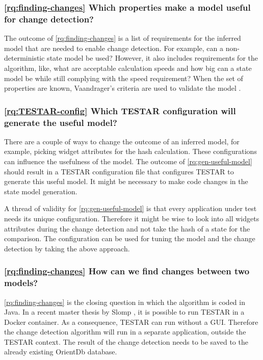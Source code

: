 \subsubsection{\ref{rq:finding-changes} Which properties make a model useful for change detection?}
The outcome of \ref{rq:finding-changes} is a list of requirements for the inferred model that are needed to enable change detection. For example, can a non-deterministic state model be used? However, it also includes requirements for the algorithm, like, what are acceptable calculation speeds and how big can a state model be while still complying with the speed requirement? When the set of properties are known, Vaandrager's criteria are used to validate the model \cite{vaandrager}.

\subsubsection{\ref{rq:TESTAR-config} Which TESTAR configuration will generate the useful model?}
There are a couple of ways to change the outcome of an inferred model, for example, picking widget attributes for the hash calculation. These configurations can influence the usefulness of the model. The outcome of \ref{rq:gen-useful-model} should result in a TESTAR configuration file that configures TESTAR to generate this useful model. It might be necessary to make code changes in the state model generation.

A thread of validity for \ref{rq:gen-useful-model} is that every application under test needs its unique configuration. Therefore it might be wise to look into all widgets attributes during the change detection and not take the hash of a state for the comparison. The configuration can be used for tuning the model and the change detection by taking the above approach.

\subsubsection{\ref{rq:finding-changes} How can we find changes between two models?}
\ref{rq:finding-changes} is the closing question in which the algorithm is coded in Java. In a recent master thesis by Slomp \cite{insert-slomp-hereTODO}, it is possible to run TESTAR in a Docker container. As a consequence, TESTAR can run without a GUI. Therefore the change detection algorithm will run in a separate application, outside the TESTAR context. The result of the change detection needs to be saved to the already existing OrientDb database. 

